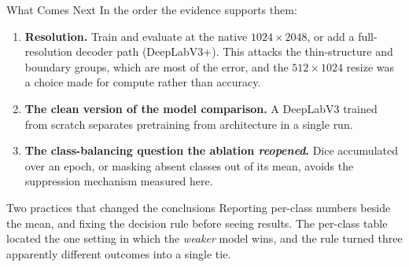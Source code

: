 \begin{frame}{What Comes Next}
\small
In the order the evidence supports them:

\begin{enumerate}
    \item \textbf{Resolution.} Train and evaluate at the native $1024 \times 2048$, or add a
          full-resolution decoder path (DeepLabV3+). This attacks the thin-structure and boundary
          groups, which are most of the error, and the $512 \times 1024$ resize was a choice made
          for compute rather than accuracy.
    \item \textbf{The clean version of the model comparison.} A DeepLabV3 trained from scratch separates pretraining
          from architecture in a single run.
    \item \textbf{The class-balancing question the ablation \emph{reopened}.} Dice accumulated over
          an epoch, or masking absent classes out of its mean, avoids the suppression mechanism
          measured here.
\end{enumerate}

\vspace{0.3cm}
\begin{block}{Two practices that changed the conclusions}
Reporting per-class numbers beside the mean, and fixing the decision rule before seeing results.
The per-class table located the one setting in which the \emph{weaker} model wins, and the rule
turned three apparently different outcomes into a single tie.
\end{block}
\end{frame}
